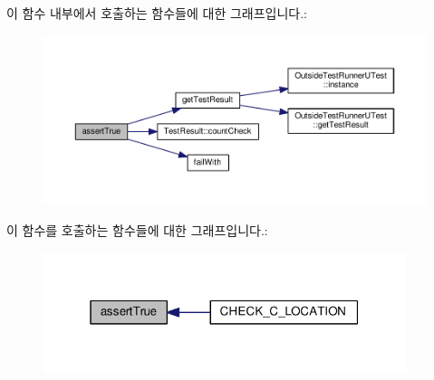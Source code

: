 이 함수 내부에서 호출하는 함수들에 대한 그래프입니다.\+:
\nopagebreak
\begin{figure}[H]
\begin{center}
\leavevmode
\includegraphics[width=350pt]{class_utest_shell_ae94c3261aae58fd432f56530ed93fac0_cgraph}
\end{center}
\end{figure}




이 함수를 호출하는 함수들에 대한 그래프입니다.\+:
\nopagebreak
\begin{figure}[H]
\begin{center}
\leavevmode
\includegraphics[width=301pt]{class_utest_shell_ae94c3261aae58fd432f56530ed93fac0_icgraph}
\end{center}
\end{figure}


